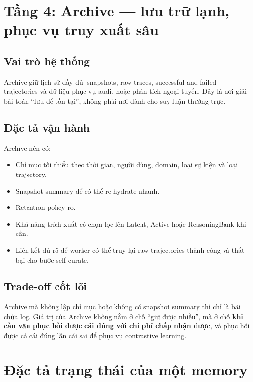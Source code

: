 \documentclass[a4paper,12pt]{article}
\begin{document}
\section{Tầng 4: Archive --- lưu trữ lạnh, phục vụ truy xuất sâu}

\subsection*{Vai trò hệ thống}

Archive giữ lịch sử đầy đủ, snapshots, raw traces, successful and failed trajectories và dữ liệu phục vụ audit hoặc phân tích ngoại tuyến. Đây là nơi giải bài toán ``lưu để tồn tại'', không phải nơi dành cho suy luận thường trực.

\subsection*{Đặc tả vận hành}

Archive nên có:
\begin{itemize}
    \item Chỉ mục tối thiểu theo thời gian, người dùng, domain, loại sự kiện và loại trajectory.
    \item Snapshot summary để có thể re-hydrate nhanh.
    \item Retention policy rõ.
    \item Khả năng trích xuất có chọn lọc lên Latent, Active hoặc ReasoningBank khi cần.
    \item Liên kết đủ rõ để worker có thể truy lại raw trajectories thành công và thất bại cho bước self-curate.
\end{itemize}

\subsection*{Trade-off cốt lõi}

Archive mà không lập chỉ mục hoặc không có snapshot summary thì chỉ là bãi chứa log. Giá trị của Archive không nằm ở chỗ ``giữ được nhiều'', mà ở chỗ \textbf{khi cần vẫn phục hồi được cái đúng với chi phí chấp nhận được}, và phục hồi được cả cái đúng lẫn cái sai để phục vụ contrastive learning.

\section{Đặc tả trạng thái của một memory}
\end{document}
